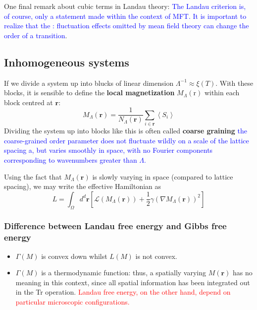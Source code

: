 \documentclass[12pt,titlepage]{article}
\newcommand{\redp}[1]{\textcolor{red}{#1}}
\newcommand{\bluep}[1]{\textcolor{blue}{#1}}
\numberwithin{equation}{section}
\begin{document}
One final remark about cubic terms in Landau theory: \bluep{The Landau criterion is, of course, only a statement made within the context of MFT. It is important to realize that the : fluctuation effects omitted by mean field theory can change the order of a transition}.

\subsection{Inhomogeneous systems}
If we divide a system up into blucks of linear dimension $\Lambda^{-1} \approx \xi(T)$. With these blocks, it is sensible to define the \textbf{local magnetization} $M_{\Lambda}(\mathrm{r})$ within each block centred at $\mathbf{r}$:
\begin{equation}
M_{\Lambda}(\mathbf{r})=\frac{1}{N_{\Lambda}(\mathbf{r})} \sum_{i \in \mathbf{r}}\left\langle S_{i}\right\rangle
\end{equation}
Dividing the system up into blocks like this is often called \textbf{coarse graining}\bluep{ the coarse-grained order parameter does not fluctuate wildly on a scale of the lattice spacing a, but
varies smoothly in space, with no Fourier components corresponding to wavenumbers greater than $\Lambda$.}

Using the fact that $M_{\Lambda}(\mathbf{r})$ is slowly varying in space (compared to lattice spacing), we may write the effective Hamiltonian as
\begin{equation}
L=\int_{\Omega} d^{d} \mathbf{r}\left[\mathcal{L}\left(M_{\Lambda}(\mathbf{r})\right)+\frac{1}{2} \gamma\left(\nabla M_{\Lambda}(\mathbf{r})\right)^{2}\right]
\end{equation}

\subsubsection{Difference between Landau free energy and Gibbs free energy}
\begin{itemize}
    \item $\Gamma(M)$ is convex down whilst $L(M)$ is not convex.
    \item $\Gamma(M)$ is a thermodynamic function: thus, a spatially varying $M(\mathbf{r})$ has no meaning in this context, since all spatial information has been integrated out in the Tr operation. \redp{Landau free energy, on the other hand, depend on particular microscopic configurations.}
\end{itemize}
\end{document}
